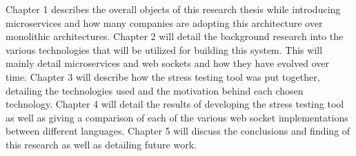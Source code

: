 Chapter 1 describes the overall objects of this research thesis while introducing microservices and how many companies are adopting this architecture over monolithic architectures. Chapter 2 will detail the background research into the various technologies that will be utilized for building this system. This will mainly detail microservices and web sockets and how they have evolved over time. Chapter 3 will describe how the stress testing tool was put together, detailing the technologies used and the motivation behind each chosen technology. Chapter 4 will detail the results of developing the stress testing tool as well as giving a comparison of each of the various web socket implementations between different languages. Chapter 5 will discuss the conclusions and finding of this research as well as detailing future work.